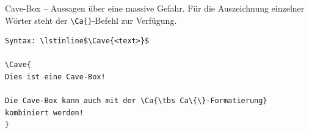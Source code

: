 \documentclass[
ngerman,
paper=a4,
asymmetric,
fontsize=10pt,
draft=false,
numbers=noenddot,
bibtotocnumbered,
footnotes=multiple,
toc=flat,
]{scrbook}
\newenvironment{Beispiel}
{\begin{tcolorbox}[title=Beispiel]

}{\end{tcolorbox}}
\begin{document}
% 
% 
% 
% 
% 

% 
% 
% 
% 





\Text
{Cave-Box -- }
{Aussagen über eine massive Gefahr.}
{}
{}
{}
{}
Für die Auszeichnung einzelner Wörter steht der
    \lstinline$\Ca{}$-Befehl zur Verfügung.


\begin{Beispiel}
\begin{lstlisting}
Syntax: \lstinline$\Cave{<text>}$

\Cave{
Dies ist eine Cave-Box!

Die Cave-Box kann auch mit der \Ca{\tbs Ca\{\}-Formatierung} kombiniert werden!
}
\end{lstlisting}
\tcblower
{}
\end{Beispiel}
\end{document}
